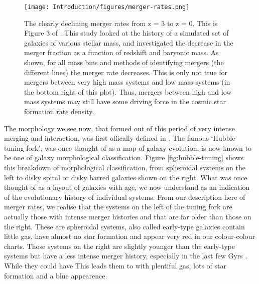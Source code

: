 \begin{figure}
    \centering
    \texttt{[image: Introduction/figures/merger-rates.png]}
    \caption{The clearly declining merger rates from z = 3 to z = 0. This is Figure 3 of \citet{2010ApJ...715..202H}. This study looked at the history of a simulated set of galaxies of various stellar mass, and investigated the decrease in the merger fraction as a function of redshift and baryonic mass. As shown, for all mass bins and methods of identifying mergers (the different lines) the merger rate decreases. This is only not true for mergers between very high mass systems and low mass systems (in the bottom right of this plot). Thus, mergers between high and low mass systems may still have some driving force in the cosmic star formation rate density.}
    \label{fig:merger-rate}
\end{figure}


The morphology we see now, that formed out of this period of very intense merging and interaction, was first offically defined in \citet{1936rene.book.....H}. The famous `Hubble tuning fork', was once thought of as a map of galaxy evolution, is now known to be one of galaxy morphological classification. Figure \ref{fig:hubble-tuning} shows this breakdown of morphological classification, from spheroidal systems on the left to disky spiral or disky barred galaxies shown on the right. What was once thought of as a layout of galaxies with age, we now understand as an indication of the evolutionary history of individual systems. From our description here of merger rates, we realise that the systems on the left of the tuning fork are actually those with intense merger histories and that are far older than those on the right. These are spheroidal systems, also called early-type galaxies contain little gas, have almost no star formation and appear very red in our colour-colour charts. Those systems on the right are slightly younger than the early-type systems but have a less intense merger history, especially in the last few Gyrs \citep{}. While they could have This leads them to with plentiful gas, lots of star formation and a blue appearence.

